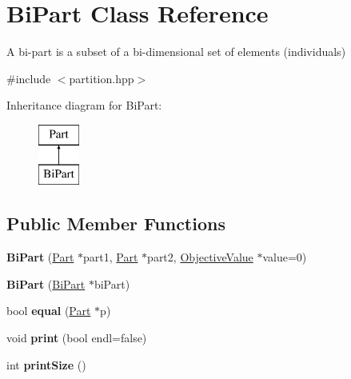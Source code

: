 \hypertarget{classBiPart}{\section{Bi\-Part Class Reference}
\label{classBiPart}
}


A bi-\/part is a subset of a bi-\/dimensional set of elements (individuals)  




{\ttfamily \#include $<$partition.\-hpp$>$}

Inheritance diagram for Bi\-Part\-:\begin{figure}[H]
\begin{center}
\leavevmode
\includegraphics[height=2.000000cm]{classBiPart}
\end{center}
\end{figure}
\subsection*{Public Member Functions}
\begin{DoxyCompactItemize}
\item 
\hypertarget{classBiPart_aa3d9446a9207461c5b9ec328c3ef61ae}{{\bfseries Bi\-Part} (\hyperlink{classPart}{Part} $\ast$part1, \hyperlink{classPart}{Part} $\ast$part2, \hyperlink{classObjectiveValue}{Objective\-Value} $\ast$value=0)}\label{classBiPart_aa3d9446a9207461c5b9ec328c3ef61ae}

\item 
\hypertarget{classBiPart_ae80858643535d37f3cc96f0fccc947ff}{{\bfseries Bi\-Part} (\hyperlink{classBiPart}{Bi\-Part} $\ast$bi\-Part)}\label{classBiPart_ae80858643535d37f3cc96f0fccc947ff}

\item 
\hypertarget{classBiPart_a242f8d88da324a08bd296ea69cd7360f}{bool {\bfseries equal} (\hyperlink{classPart}{Part} $\ast$p)}\label{classBiPart_a242f8d88da324a08bd296ea69cd7360f}

\item 
\hypertarget{classBiPart_a2fb0a97551bcfc4a9bda5fa1307703d6}{void {\bfseries print} (bool endl=false)}\label{classBiPart_a2fb0a97551bcfc4a9bda5fa1307703d6}

\item 
\hypertarget{classBiPart_aace53eab6f4e8b2f676c0ed7d8f6c9b5}{int {\bfseries print\-Size} ()}\label{classBiPart_aace53eab6f4e8b2f676c0ed7d8f6c9b5}

\end{DoxyCompactItemize}
